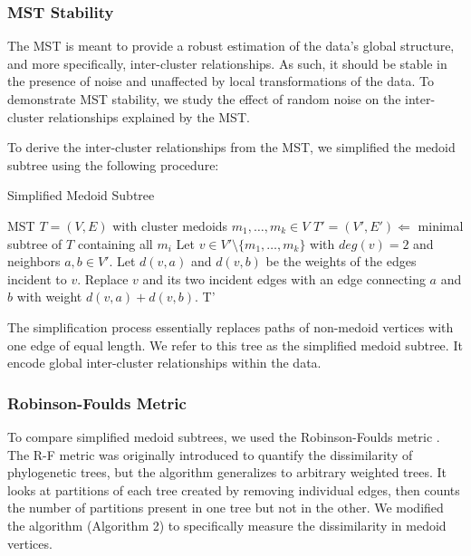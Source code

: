 \documentclass{article}
\begin{document}
\subsubsection{MST Stability}
The MST is meant to provide a robust estimation of the data's global structure, and more specifically, inter-cluster relationships. As such, it should be stable in the presence of noise and unaffected by local transformations of the data. To demonstrate MST stability, we study the effect of random noise on the inter-cluster relationships explained by the MST.

To derive the inter-cluster relationships from the MST, we simplified the medoid subtree using the following procedure:

\begin{algorithm}[H]
\caption{Simplified Medoid Subtree}\label{algo1}
\begin{algorithmic}[1]
\Require MST $T = (V, E)$ with cluster medoids $m_1, \hdots, m_k \in V$
\State $T' = (V', E') \Leftarrow$ minimal subtree of $T$ containing all $m_i$
\Repeat
	\State Let $v \in V' \setminus \{m_1,  \hdots, m_k\}$ with $deg(v) = 2$ and neighbors $a, b \in V'$. Let $d(v, a)$ and $d(v, b)$ be the weights of the edges incident to $v$.
	\State Replace $v$ and its two incident edges with an edge connecting $a$ and $b$ with weight $d(v, a) + d(v, b)$.
\State \Output T'
\end{algorithmic}
\end{algorithm}

The simplification process essentially replaces paths of non-medoid vertices with one edge of equal length. We refer to this tree as the simplified medoid subtree. It encode global inter-cluster relationships within the data.

\subsubsection{Robinson-Foulds Metric}
To compare simplified medoid subtrees, we used the Robinson-Foulds metric \cite{RF metric}. The R-F metric was originally introduced to quantify the dissimilarity of phylogenetic trees, but the algorithm generalizes to arbitrary weighted trees. It looks at partitions of each tree created by removing individual edges, then counts the number of partitions present in one tree but not in the other. We modified the algorithm (Algorithm 2) to specifically measure the dissimilarity in medoid vertices.
\end{document}
